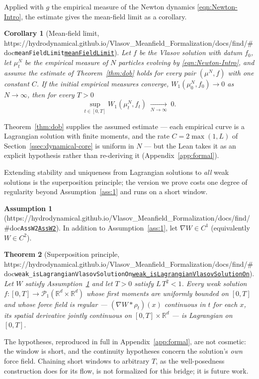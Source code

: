 \documentclass[11pt]{article}
\theoremstyle{plain}
\newtheorem{theorem}{Theorem}[section]
\newtheorem{corollary}[theorem]{Corollary}
\theoremstyle{definition}
\newtheorem{assumption}{Assumption}
\theoremstyle{remark}
\newcommand{\R}{\mathbb{R}}
\newcommand{\Wone}{W_1}
\newcommand{\lean}[1]{\texttt{#1}}
\newcommand{\leanbaseurl}{https://hydrodynamical.github.io/Vlasov\_Meanfield\_Formalization/docs/find/\#doc}
\newcommand{\leanlink}[1]{\ifx\leanbaseurl\empty\lean{#1}\else\href{\leanbaseurl/Vlasov.#1}{\lean{#1}}\fi}
\begin{document}
\noindent Applied with $g$ the empirical measure of the Newton dynamics
\eqref{eqn:Newton-Intro}, the estimate gives the mean-field limit as a corollary.
\begin{corollary}[Mean-field limit, \leanlink{meanFieldLimit}]\label{cor:mfl}
  Let $f$ be the Vlasov solution with datum $f_0$, let $\mu^N_t$ be the empirical measure of
  $N$ particles evolving by \eqref{eqn:Newton-Intro}, and assume the estimate of
  Theorem~\ref{thm:dob} holds for every pair $(\mu^N,f)$ with one constant $C$. If the initial
  empirical measures converge, $\Wone(\mu^N_0,f_0)\to0$ as $N\to\infty$, then for every $T>0$
  \[ \sup_{t\in[0,T]}\Wone(\mu^N_t,f_t)\;\xrightarrow[N\to\infty]{}\;0. \]
\end{corollary}
\noindent Theorem~\ref{thm:dob} supplies the assumed estimate --- each empirical curve is a
Lagrangian solution with finite moments, and the rate $C=2\max(1,L)$ of
Section~\ref{ssec:dynamical-core} is uniform in $N$ --- but the Lean takes it as an explicit
hypothesis rather than re-deriving it (Appendix~\ref{app:formal}).

Extending stability and uniqueness from Lagrangian solutions to \emph{all} weak solutions is the
superposition principle; the version we prove costs one degree of regularity beyond
Assumption~\ref{ass:1} and runs on a short window.
\begin{assumption}[\leanlink{AssW2}]\label{ass:2}
  In addition to Assumption~\ref{ass:1}, let $\nabla W \in C^1$ (equivalently $W \in C^2$).
\end{assumption}
\begin{theorem}[Superposition principle, \leanlink{weak\_isLagrangianVlasovSolutionOn}]\label{thm:superposition}
  Let $W$ satisfy Assumption~\ref{ass:2} and let $T>0$ satisfy $L\,T^{2}<1$. Every weak solution
  $f:[0,T]\to\mathcal{P}_1(\R^d\times\R^d)$ whose first moments are uniformly bounded on $[0,T]$
  and whose force field is regular --- $(\nabla W*\rho_t)(x)$ continuous in $t$ for each $x$, its
  spatial derivative jointly continuous on $[0,T]\times\R^d$ --- is Lagrangian on $[0,T]$.
\end{theorem}
\noindent The hypotheses, reproduced in full in Appendix~\ref{app:formal}, are not cosmetic: the
window is short, and the continuity hypotheses concern the solution's \emph{own} force field.
Chaining short windows to arbitrary $T$, as the well-posedness construction does for its flow,
is not formalized for this bridge; it is future work.
\end{document}
